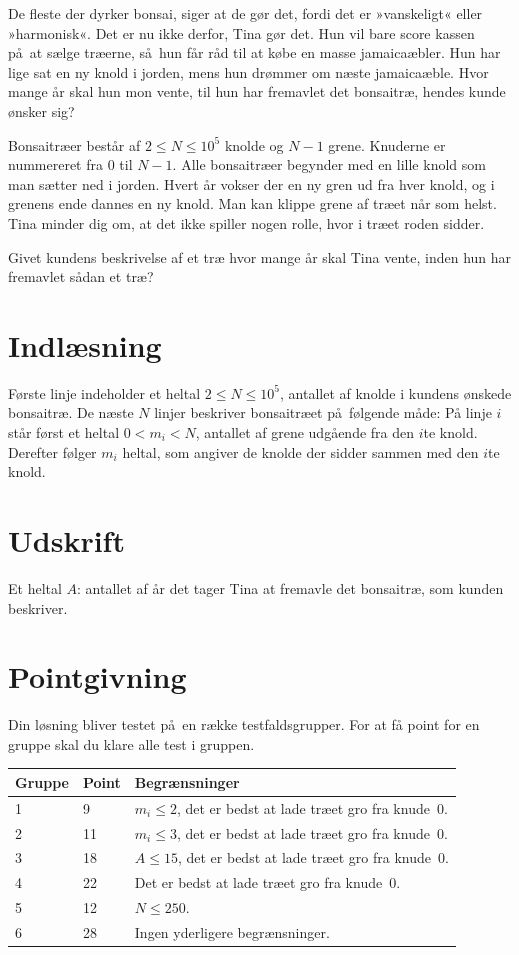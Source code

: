 
De fleste der dyrker bonsai, siger at de gør det, fordi det er »vanskeligt« eller »harmonisk«.
Det er nu ikke derfor, Tina gør det.
Hun vil bare score kassen på at sælge træerne, så hun får råd til at købe en masse jamaicaæbler.
Hun har lige sat en ny knold i jorden, mens hun drømmer om næste jamaicaæble.
Hvor mange år skal hun mon vente, til hun har fremavlet det bonsaitræ, hendes kunde ønsker sig?

Bonsaitræer består af $2\leq N \leq 10^5$ knolde og $N-1$ grene.
Knuderne er nummereret fra $0$ til $N-1$. 
Alle bonsaitræer begynder med en lille knold som man sætter ned i jorden.
Hvert år vokser der en ny gren ud fra hver knold, og i grenens ende dannes en ny knold.
Man kan klippe grene af træet når som helst. 
Tina minder dig om, at det ikke spiller nogen rolle, hvor i træet roden sidder.

Givet kundens beskrivelse af et træ hvor mange år skal Tina vente, inden hun har fremavlet sådan et træ?

\section*{Indlæsning}

Første linje indeholder et heltal $2\leq N\leq 10^5$, antallet af knolde i kundens ønskede bonsaitræ.
De næste $N$ linjer beskriver bonsaitræet på følgende måde:
På linje $i$ står først et heltal $0 < m_i < N$, antallet af grene udgående fra den $i$te knold. 
Derefter følger $m_i$ heltal, som angiver de knolde der sidder sammen med den $i$te knold.

\section*{Udskrift}
Et heltal $A$: antallet af år det tager Tina at fremavle det bonsaitræ, som kunden beskriver.

\section*{Pointgivning}

Din løsning bliver testet på en række testfaldsgrupper.
For at få point for en gruppe skal du klare alle test i gruppen. 

\noindent
\begin{tabular}{| l | l | l |}
\hline
Gruppe & Point      & Begrænsninger \\ \hline
1      &  9         & $m_i\leq 2$, det er bedst at lade træet gro fra knude~0.\\ \hline
2      & 11         & $m_i \leq 3$, det er bedst at lade træet gro fra knude~0. \\ \hline
3      & 18         & $A \leq 15$, det er bedst at lade træet gro fra knude~0. \\ \hline
4      & 22         & Det er bedst at lade træet gro fra knude~0. \\ \hline
5      & 12         & $N \leq 250$. \\ \hline
6      & 28         & Ingen yderligere begrænsninger. \\ \hline
\end{tabular}


